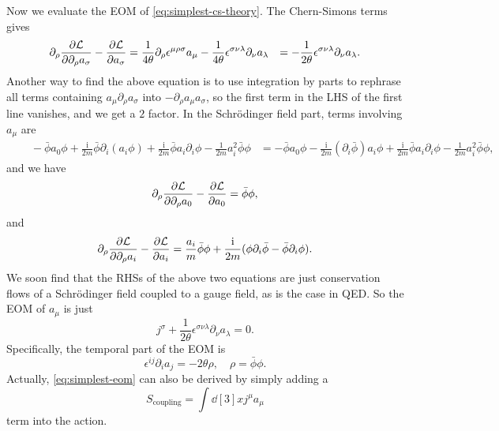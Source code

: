 \documentclass[hyperref, a4paper]{article}
\newcommand*{\ii}{\mathrm{i}}
\def\\{}%
\begin{document}
Now we evaluate the EOM of \eqref{eq:simplest-cs-theory}. The Chern-Simons terms gives 
\[
    \begin{aligned}
        \partial_\rho \pdv{\mathcal{L}}{\partial_\rho a_\sigma} - \pdv{\mathcal{L}}{a_\sigma} &= 
        \frac{1}{4 \theta} \partial_\rho \epsilon^{\mu \rho \sigma} a_\mu - \frac{1}{4\theta} \epsilon^{\sigma \nu \lambda} \partial_\nu a_\lambda \\
        &= -  \frac{1}{2 \theta} \epsilon^{\sigma \nu \lambda} \partial_\nu a_\lambda.
    \end{aligned}
\]
Another way to find the above equation is to use integration by parts to rephrase all terms 
containing $a_\mu \partial_\rho a_\sigma$ into $- \partial_\rho a_\mu a_\sigma$, so the first term in the 
LHS of the first line vanishes, and we get a $2$ factor.
In the Schrödinger field part, terms involving $a_\mu$ are 
\[
    \begin{aligned}
        &\quad - \bar{\phi} a_0 \phi + \frac{\ii}{2m} \bar{\phi} \partial_i (a_i \phi) 
        + \frac{\ii}{2m} \bar{\phi} a_i \partial_i \phi - \frac{1}{2m} a_i^2 \bar{\phi} \phi \\
        &= - \bar{\phi} a_0 \phi - \frac{\ii}{2m} (\partial_i \bar{\phi}) a_i \phi 
        + \frac{\ii}{2m} \bar{\phi} a_i \partial_i \phi - \frac{1}{2m} a_i^2 \bar{\phi} \phi  ,
    \end{aligned}
\]
and we have 
\[
    \partial_\rho \pdv{\mathcal{L}}{\partial_\rho a_0} - \pdv{\mathcal{L}}{a_0} = \bar{\phi} \phi,
\]
and 
\[
    \partial_\rho \pdv{\mathcal{L}}{\partial_\rho a_i} - \pdv{\mathcal{L}}{a_i} 
    = \frac{a_i}{m} \bar{\phi} \phi + \frac{\ii}{2m} (\phi \partial_i \bar{\phi} - \bar{\phi} \partial_i \phi).
\]
We soon find that the RHSs of the above two equations are just conservation flows of a Schrödinger field 
coupled to a gauge field, as is the case in QED. So the EOM of $a_\mu$ is just 
\begin{equation}
    j^\sigma + \frac{1}{2 \theta} \epsilon^{\sigma \nu \lambda} \partial_\nu a_\lambda = 0.
    \label{eq:simplest-eom}
\end{equation} 
Specifically, the temporal part of the EOM is 
\begin{equation}
    \epsilon^{i j} \partial_{i} a_{j} = - 2 \theta \rho, \quad \rho = \bar{\phi} \phi.
\end{equation}
Actually, \eqref{eq:simplest-eom} can also be derived by simply adding a 
\begin{equation}
    S_\text{coupling} = \int \dd[3]{x} j^\mu a_\mu
\end{equation}
term into the action. 
\end{document}
